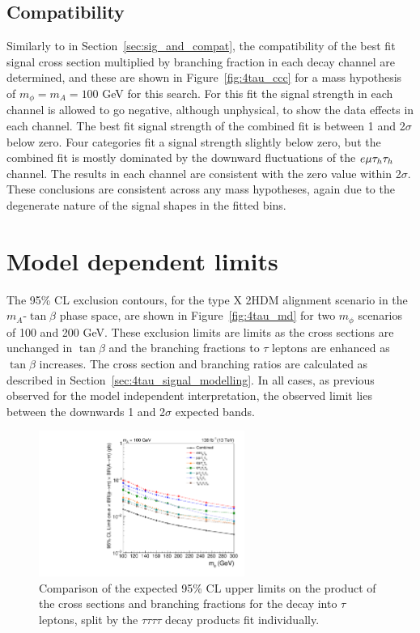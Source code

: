 \subsection{Compatibility}

Similarly to in Section~\ref{sec:sig_and_compat}, the compatibility of the best fit signal cross section multiplied by branching fraction in each decay channel are determined, and these are shown in Figure~\ref{fig:4tau_ccc} for a mass hypothesis of $m_{\phi}=m_{A}=100$ GeV for this search.
For this fit the signal strength in each channel is allowed to go negative, although unphysical, to show the data effects in each channel.
The best fit signal strength of the combined fit is between 1 and 2$\sigma$ below zero.
Four categories fit a signal strength slightly below zero, but the combined fit is mostly dominated by the downward fluctuations of the $e\mu\tau_{h}\tau_{h}$ channel.
The results in each channel are consistent with the zero value within 2$\sigma$.
These conclusions are consistent across any mass hypotheses, again due to the degenerate nature of the signal shapes in the fitted bins.

\section{Model dependent limits}

The 95\% \ac{CL} exclusion contours, for the type X \ac{2HDM} alignment scenario in the $m_A$-$\tan\beta$ phase space, are shown in Figure~\ref{fig:4tau_md} for two $m_{\phi}$ scenarios of 100 and 200 GeV.
These exclusion limits are  limits as the cross sections are unchanged in $\tan\beta$ and the branching fractions to $\tau$ leptons are enhanced as $\tan\beta$ increases.
The cross section and branching ratios are calculated as described in Section~\ref{sec:4tau_signal_modelling}.
In all cases, as previous observed for the model independent interpretation, the observed limit lies between the downwards 1 and 2$\sigma$ expected bands. \\


\begin{figure}[!hbtp]
\centering
    \includegraphics[width=0.6\textwidth]{Figures/limit_comparison_4tau.pdf}
\caption{Comparison of the expected 95\% CL upper limits on the product of the cross sections and branching fractions for the decay into $\tau$ leptons, split by the $\tau\tau\tau\tau$ decay products fit individually.}
\label{fig:4tau_limit_comparison}
\end{figure}

